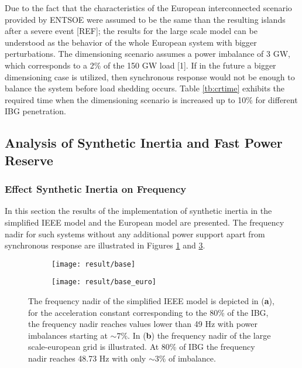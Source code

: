 
Due to the fact that the characteristics of the  European interconnected scenario provided by ENTSOE were assumed to be the same than the resulting islands after a severe event [REF]; the results for the large scale model can be understood as the behavior of the whole European system with bigger perturbations. The dimensioning scenario assumes a power imbalance of 3 GW, which corresponds to a 2\% of the 150 GW load [1]. If in the future a bigger dimensioning case is utilized, then synchronous response would not be enough to balance the system before load shedding occurs. Table \ref{tb:crtime} exhibits the required time when the dimensioning scenario is increased up to 10\% for different IBG penetration.



\subsection{Analysis of Synthetic Inertia and Fast Power Reserve}

\subsubsection{Effect Synthetic Inertia on Frequency}
\label{sec:res_si}
In this section the results of the implementation of synthetic inertia in the simplified IEEE model and the European model are presented. The frequency nadir for such systems without any additional power support apart from synchronous response are illustrated in Figures \ref{fig:res_nadirieee_simp} and \ref{fig:res_nadireuro}. \\

\begin{figure}[h]
	\centering
	\begin{subfigure}[h]{0.49\textwidth}
		\centering
		\texttt{[image: result/base]}
		\caption{}
		\label{fig:res_nadirieee_simp}
	\end{subfigure}
	\hfill
	\begin{subfigure}[h]{0.49\textwidth}
		\centering
		\texttt{[image: result/base\_euro]}
		\caption{}
		\label{fig:res_nadireuro}
	\end{subfigure}
	
	
	\caption{The frequency nadir of the simplified IEEE model is depicted in (\textbf{a}), for the acceleration constant corresponding to the 80\% of the IBG, the frequency nadir reaches values lower than 49 Hz with power imbalances starting at $ \sim 7\% $. In (\textbf{b}) the frequency nadir of the large scale-european grid is illustrated. At 80\% of IBG the frequency nadir reaches 48.73 Hz with only $\sim 3\% $ of imbalance.}
\end{figure}




